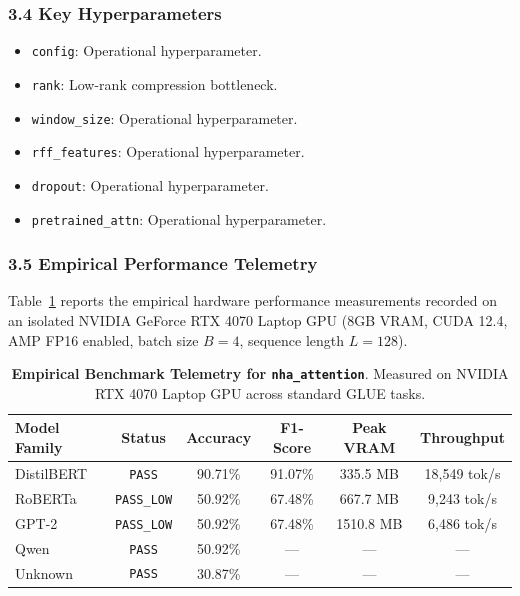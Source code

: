 \subsubsection*{3.4 Key Hyperparameters}
\begin{itemize}
    \item \texttt{config}: Operational hyperparameter.
    \item \texttt{rank}: Low-rank compression bottleneck.
    \item \texttt{window\_size}: Operational hyperparameter.
    \item \texttt{rff\_features}: Operational hyperparameter.
    \item \texttt{dropout}: Operational hyperparameter.
    \item \texttt{pretrained\_attn}: Operational hyperparameter.
\end{itemize}

\subsubsection*{3.5 Empirical Performance Telemetry}
Table~\ref{tab:telemetry_nha_attention} reports the empirical hardware performance measurements recorded on an isolated NVIDIA GeForce RTX 4070 Laptop GPU (8GB VRAM, CUDA 12.4, AMP FP16 enabled, batch size $B=4$, sequence length $L=128$).

\begin{table}[h]
\centering
\small
\caption{\textbf{Empirical Benchmark Telemetry for \texttt{nha\_attention}}. Measured on NVIDIA RTX 4070 Laptop GPU across standard GLUE tasks.}
\label{tab:telemetry_nha_attention}
\begin{tabular*}{\columnwidth}{@{\extracolsep{\fill}}lccccc}
\toprule
\textbf{Model Family} & \textbf{Status} & \textbf{Accuracy} & \textbf{F1-Score} & \textbf{Peak VRAM} & \textbf{Throughput} \\
\midrule
DistilBERT & \texttt{PASS} & 90.71\% & 91.07\% & 335.5 MB & 18,549 tok/s \\
RoBERTa & \texttt{PASS\_LOW} & 50.92\% & 67.48\% & 667.7 MB & 9,243 tok/s \\
GPT-2 & \texttt{PASS\_LOW} & 50.92\% & 67.48\% & 1510.8 MB & 6,486 tok/s \\
Qwen & \texttt{PASS} & 50.92\% & --- & --- & --- \\
Unknown & \texttt{PASS} & 30.87\% & --- & --- & --- \\
\bottomrule
\end{tabular*}
\end{table}


